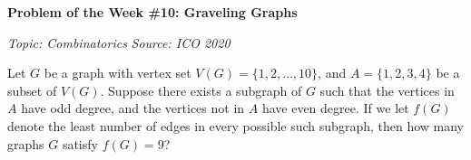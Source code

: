 \begin{potw}\vspace{5pt}
{\large\textbf{Problem of the Week \#10: Graveling Graphs}}\vspace{5pt}

\textit{Topic: Combinatorics}\newline
\textit{Source: ICO 2020}\V

Let $G$ be a graph with vertex set $V(G) = \{1,2,\hdots, 10\}$, and $A = \{1,2,3,4\}$ be a subset of $V(G)$. Suppose there exists a subgraph of $G$ such that the vertices in $A$ have odd degree, and the vertices not in $A$ have even degree. If we let $f(G)$ denote the least number of edges in every possible such subgraph, then how many graphs $G$ satisfy $f(G) = 9$?
\end{potw}\V
